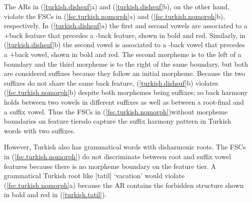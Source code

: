 \documentclass[,doc,floatsintext]{apa6}
\theoremstyle{definition}
\theoremstyle{definition}
\theoremstyle{definition}
\theoremstyle{remark}
\begin{document}
The ARs in (\ref{turkish.dishsuf}a) and (\ref{turkish.dishsuf}b), on the
other hand, violate the FSCs in (\ref{fsc.turkish.nomorph}a) and
(\ref{fsc.turkish.nomorph}b), respectively. In (\ref{turkish.dishsuf}a)
the first and second vowels are associated to a +back feature that
precedes a -back feature, shown in bold and red. Similarly, in
(\ref{turkish.dishsuf}b) the second vowel is associated to a -back vowel
that precedes a +back vowel, shown in bold and red. The second morpheme
is to the left of a boundary and the third morpheme is to the right of
the same boundary, but both are considered suffixes because they follow
an initial morpheme. Because the two suffixes do not share the same back
feature, (\ref{turkish.dishsuf}b) violates (\ref{fsc.turkish.nomorph}b)
despite both morphemes being suffixes; so back harmony holds between two
vowels in different suffixes as well as between a root-final and a
suffix vowel. Thus the FSCs in
(\ref{fsc.turkish.nomorph})\textemdash without morpheme boundaries on
feature tiers\textemdash do capture the suffix harmony pattern in
Turkish words with two suffixes.

However, Turkish also has grammatical words with disharmonic roots. The
FSCs in (\ref{fsc.turkish.nomorph}) do not discriminate between root and
suffix vowel features because there is no morpheme boundary on the
feature tier. A grammatical Turkish root like {[}tatil{]} `vacation'
would violate (\ref{fsc.turkish.nomorph}a) because the AR contains the
forbidden structure shown in bold and red in (\ref{turkish.tatil}).
\newpage

\begin{exe}
 \label{turkish.tatil} \\
\end{exe}
\end{document}
